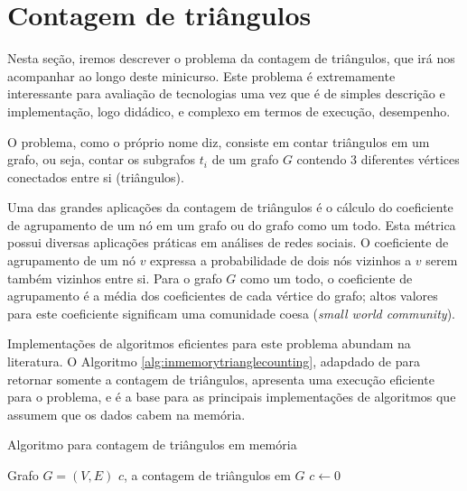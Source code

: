 \section{Contagem de triângulos} 
\label{sec:triangulos}

Nesta seção, iremos descrever o problema da contagem de triângulos, que irá nos acompanhar
ao longo deste minicurso. Este problema é extremamente interessante para avaliação de 
tecnologias uma vez que é de simples descrição e implementação, logo didádico, e complexo
em termos de execução, desempenho.

O problema, como o próprio nome diz, consiste em contar triângulos em um grafo, ou seja,
contar os subgrafos $t_i$ de um grafo $G$ contendo 3 diferentes vértices conectados entre si 
(triângulos). 

Uma das grandes aplicações da contagem de triângulos é o cálculo do coeficiente de agrupamento 
de um nó em um grafo ou do grafo como um todo. Esta métrica possui diversas aplicações práticas 
em análises de redes sociais. O coeficiente de agrupamento de um nó $v$ expressa a probabilidade de 
dois nós vizinhos a $v$ serem também vizinhos entre si. Para o grafo $G$ como um todo, o coeficiente 
de agrupamento é a média dos coeficientes de cada vértice do grafo; altos valores para este coeficiente 
significam uma comunidade coesa (\emph{small world community}).

Implementações de algoritmos eficientes para este problema abundam na literatura. O Algoritmo 
\ref{alg:inmemorytrianglecounting}, adapdado de \cite{Chu2012} para retornar somente a contagem de 
triângulos, apresenta uma execução eficiente para o problema, e é a base para as principais 
implementações de algoritmos que assumem que os dados cabem na memória. 

\begin{algorithm}
\caption{Algoritmo para contagem de triângulos em memória}
\label{alg:inmemorytrianglecounting}
\begin{algorithmic}[1]
    \REQUIRE Grafo $G = (V, E)$
    \ENSURE $c$, a contagem de triângulos em $G$
    \STATE $c \leftarrow 0$
            \ENDFOR
        \ENDFOR
    \ENDFOR 
\end{algorithmic}
\end{algorithm}

